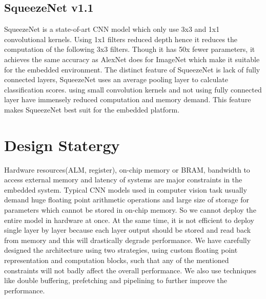 \documentclass[conference]{IEEEtran}
\begin{document}
\subsection{SqueezeNet v1.1}
SqueezeNet is a state-of-art CNN model which only use 3x3 and 1x1 convolutional kernels. Using 1x1 filters reduced depth hence it reduces the computation of the following 3x3 filters. Though it has 50x fewer parameters, it achieves the same accuracy as AlexNet does for ImageNet which make it suitable for the embedded environment. The distinct feature of SqueezeNet is lack of fully connected layers, SqueezeNet uses an average pooling layer to calculate classification scores. using small convolution kernels and not using fully connected layer have immensely reduced computation and memory demand. This feature makes SqueezeNet best suit for the embedded platform.


\section{Design Statergy}
Hardware resources(ALM, register), on-chip memory or BRAM, bandwidth to access external memory and latency of systems are major constraints in the embedded system. Typical CNN models used in computer vision task usually demand huge floating point arithmetic operations and large size of storage for parameters which cannot be stored in on-chip memory. So we cannot deploy the entire model in hardware at once. At the same time, it is not efficient to deploy single layer by layer because each layer output should be stored and read back from memory and this will drastically degrade performance. We have carefully designed the architecture using two strategies, using custom floating point representation and computation blocks, such that any of the mentioned constraints will not badly affect the overall performance.  We also use techniques like double buffering, prefetching and pipelining to further improve the performance.
\end{document}
